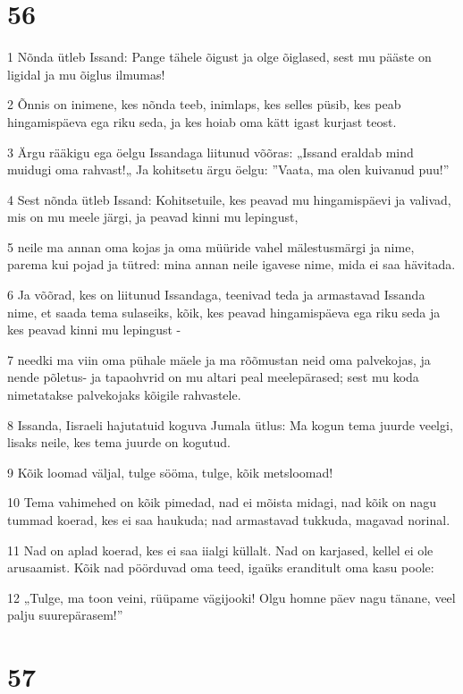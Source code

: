 \chapter{56}

\par 1 Nõnda ütleb Issand: Pange tähele õigust ja olge õiglased, sest mu pääste on ligidal ja mu õiglus ilmumas!
\par 2 Õnnis on inimene, kes nõnda teeb, inimlaps, kes selles püsib, kes peab hingamispäeva ega riku seda, ja kes hoiab oma kätt igast kurjast teost.
\par 3 Ärgu rääkigu ega öelgu Issandaga liitunud võõras: „Issand eraldab mind muidugi oma rahvast!„ Ja kohitsetu ärgu öelgu: ”Vaata, ma olen kuivanud puu!”
\par 4 Sest nõnda ütleb Issand: Kohitsetuile, kes peavad mu hingamispäevi ja valivad, mis on mu meele järgi, ja peavad kinni mu lepingust,
\par 5 neile ma annan oma kojas ja oma müüride vahel mälestusmärgi ja nime, parema kui pojad ja tütred: mina annan neile igavese nime, mida ei saa hävitada.
\par 6 Ja võõrad, kes on liitunud Issandaga, teenivad teda ja armastavad Issanda nime, et saada tema sulaseiks, kõik, kes peavad hingamispäeva ega riku seda ja kes peavad kinni mu lepingust -
\par 7 needki ma viin oma pühale mäele ja ma rõõmustan neid oma palvekojas, ja nende põletus- ja tapaohvrid on mu altari peal meelepärased; sest mu koda nimetatakse palvekojaks kõigile rahvastele.
\par 8 Issanda, Iisraeli hajutatuid koguva Jumala ütlus: Ma kogun tema juurde veelgi, lisaks neile, kes tema juurde on kogutud.
\par 9 Kõik loomad väljal, tulge sööma, tulge, kõik metsloomad!
\par 10 Tema vahimehed on kõik pimedad, nad ei mõista midagi, nad kõik on nagu tummad koerad, kes ei saa haukuda; nad armastavad tukkuda, magavad norinal.
\par 11 Nad on aplad koerad, kes ei saa iialgi küllalt. Nad on karjased, kellel ei ole arusaamist. Kõik nad pöörduvad oma teed, igaüks eranditult oma kasu poole:
\par 12 „Tulge, ma toon veini, rüüpame vägijooki! Olgu homne päev nagu tänane, veel palju suurepärasem!”

\chapter{57}

